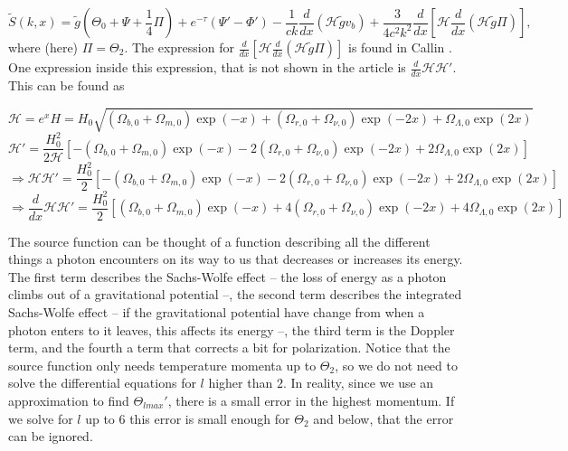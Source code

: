 \documentclass[a4paper,norsk, 10pt]{article}
\begin{document}
\begin{equation}\label{eq:S}
\tilde{S}(k,x) = \tilde{g}\left(\Theta_0 + \Psi + \frac{1}{4}\Pi\right) +e^{-\tau}\left(\Psi' - \Phi'\right)  - \frac{1}{ck}\frac{d}{dx}\left(\mathcal{H}\tilde{g}v_b\right) + \frac{3}{4c^2k^2}\frac{d}{dx}\left[\mathcal{H}\frac{d}{dx}\left(\mathcal{H}\tilde{g}\Pi\right) \right],
\end{equation}
where (here) $\Pi = \Theta_2$. The expression for $\frac{d}{dx}\left[\mathcal{H}\frac{d}{dx}\left(\mathcal{H}\tilde{g}\Pi\right) \right]$ is found in Callin \cite{callin}. One expression inside this expression, that is not shown in the article is $\frac{d}{dx}\mathcal{H}\mathcal{H}'$. This can be found as

\begin{equation}
\mathcal{H} = e^x H = H_0 \sqrt{(\Omega_{b,0} + \Omega_{m,0})\exp(-x) + (\Omega_{r,0} + \Omega_{\nu,0})\exp(-2x) + \Omega_{\Lambda,0}\exp(2x)}    
\end{equation}
\begin{equation}
\mathcal{H}' = \frac{H_0^2}{2\mathcal{H}}\left[-(\Omega_{b,0} + \Omega_{m,0})\exp(-x) -2 (\Omega_{r,0} + \Omega_{\nu,0})\exp(-2x) + 2\Omega_{\Lambda,0}\exp(2x)\right]  
\end{equation}
\begin{equation}
\Rightarrow \mathcal{H}\mathcal{H}' = \frac{H_0^2}{2}\left[-(\Omega_{b,0} + \Omega_{m,0})\exp(-x) -2 (\Omega_{r,0} + \Omega_{\nu,0})\exp(-2x) + 2\Omega_{\Lambda,0}\exp(2x)\right]
\end{equation}
\begin{equation}
\Rightarrow \frac{d}{dx} \mathcal{H}\mathcal{H}' = \frac{H_0^2}{2}\left[(\Omega_{b,0} + \Omega_{m,0})\exp(-x) +4 (\Omega_{r,0} + \Omega_{\nu,0})\exp(-2x) + 4\Omega_{\Lambda,0}\exp(2x)\right]
\end{equation}

The source function can be thought of a function describing all the different things a photon encounters on its way to us that decreases or increases its energy. The first term describes the Sachs-Wolfe effect -- the loss of energy as a photon climbs out of a gravitational potential --, the second term describes the integrated Sachs-Wolfe effect -- if the gravitational potential have change from when a photon enters to it leaves, this affects its energy --, the third term is the Doppler term, and the fourth a term that corrects a bit for polarization. Notice that the source function only needs temperature momenta up to $\Theta_2$, so we do not need to solve the differential equations for $l$ higher than $2$. In reality, since we use an approximation to find $\Theta_{lmax}'$, there is a small error in the highest momentum. If we solve for $l$ up to $6$ this error is small enough for $\Theta_2$ and below, that the error can be ignored.
\end{document}
